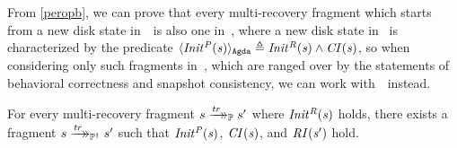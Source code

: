 From \cref{peropb}, we can prove that every multi-recovery fragment which starts from a new disk state in~\Prog\ is also one in~\ProgInv, where a new disk state in \ProgInv\ is characterized by the predicate $\langle \mathit{Init^P(s)} \rangle_\mathtt{Agda} {}\triangleq{} \mathit{Init^R(s)} \land \mathit{CI(s)}$, so when considering only such fragments in~\Prog, which are ranged over by the statements of behavioral correctness and snapshot consistency, we can work with~\ProgInv\ instead.
\begin{lemma}
For every multi-recovery fragment $s \xrightarrow{\mathit{tr}}\mathrel{\mkern-14mu}\rightarrow_{\mathbb P} s'$ where $\mathit{Init^R(s)}$ holds, there exists a fragment $s \xrightarrow{\mathit{tr}}\mathrel{\mkern-14mu}\rightarrow_{\mathbb P^\dagger} s'$ such that $\mathit{Init^P(s)}$, $\mathit{CI(s)}$, and $\mathit{RI(s')}$ hold.
\end{lemma}

